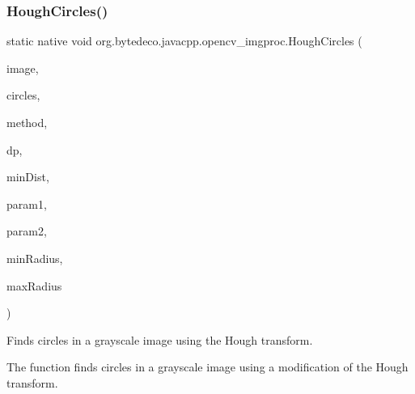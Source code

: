 \subsubsection{\texorpdfstring{Hough\+Circles()}{HoughCircles()}}
{\footnotesize\ttfamily static native void org.\+bytedeco.\+javacpp.\+opencv\+\_\+imgproc.\+Hough\+Circles (\begin{DoxyParamCaption}\item[{@By\+Val Mat}]{image,  }\item[{@By\+Val Mat}]{circles,  }\item[{int}]{method,  }\item[{double}]{dp,  }\item[{double}]{min\+Dist,  }\item[{double}]{param1,  }\item[{double}]{param2,  }\item[{int}]{min\+Radius,  }\item[{int}]{max\+Radius }\end{DoxyParamCaption})\hspace{0.3cm}{\ttfamily [static]}}



Finds circles in a grayscale image using the Hough transform. 

The function finds circles in a grayscale image using a modification of the Hough transform. 

